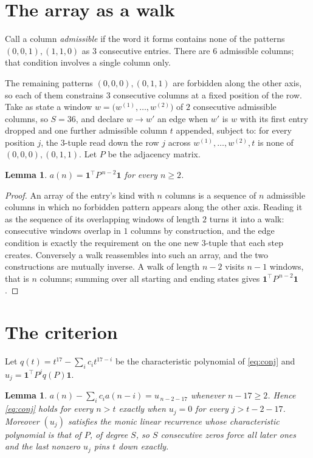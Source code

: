 \documentclass[11pt,a4paper]{article}
\theoremstyle{plain}
\newtheorem{lemma}[theorem]{Lemma}
\theoremstyle{definition}
\begin{document}
\section{The array as a walk}

Call a column \emph{admissible} if the word it forms contains none of the patterns
$(0,0,1), (1,1,0)$ as $3$ consecutive entries. There are $6$ admissible columns; that condition
involves a single column only.

The remaining patterns $(0,0,0), (0,1,1)$ are forbidden along the other axis, so each of them
constrains $3$ consecutive columns at a fixed position of the row. Take as state a
window $w=\bigl(w^{(1)},\dots,w^{(2)}\bigr)$ of $2$ consecutive admissible
columns, so $S=36$, and declare $w\to w'$ an edge when $w'$ is $w$ with its first entry
dropped and one further admissible column $t$ appended, subject to: for every position
$j$, the $3$-tuple read down the row $j$ across $w^{(1)},\dots,w^{(2)},t$
is none of $(0,0,0), (0,1,1)$. Let $P$ be the adjacency matrix.

\begin{lemma}\label{lem:walk}
$a(n)=\mathbf{1}^{\!\top}P^{\,n-2}\mathbf{1}$ for every $n\ge2$.
\end{lemma}

\begin{proof}
An array of the entry's kind with $n$ columns is a sequence of $n$ admissible columns in
which no forbidden pattern appears along the other axis. Reading it as the sequence of its
overlapping windows of length $2$ turns it into a walk: consecutive windows overlap in
$1$ columns by construction, and the edge condition is exactly the requirement on the one
new $3$-tuple that each step creates. Conversely a walk reassembles into such an array,
and the two constructions are mutually inverse. A walk of length $n-2$ visits $n-1$
windows, that is $n$ columns; summing over all starting and ending states gives
$\mathbf{1}^{\!\top}P^{\,n-2}\mathbf{1}$.
\end{proof}

\section{The criterion}

Let $q(t)=t^{17}-\sum_i c_i t^{17-i}$ be the characteristic polynomial of
\eqref{eq:conj} and $u_j=\mathbf{1}^{\!\top}P^{j}q(P)\mathbf{1}$.

\begin{lemma}\label{lem:crit}
$a(n)-\sum_i c_i a(n-i)=u_{\,n-2-17}$ whenever $n-17\ge2$. Hence
\eqref{eq:conj} holds for every $n>t$ exactly when $u_j=0$ for every
$j>t-2-17$. Moreover $(u_j)$ satisfies the monic linear recurrence whose
characteristic polynomial is that of $P$, of degree $S$, so $S$ consecutive zeros force all
later ones and the last nonzero $u_j$ pins $t$ down exactly.
\end{lemma}
\end{document}
